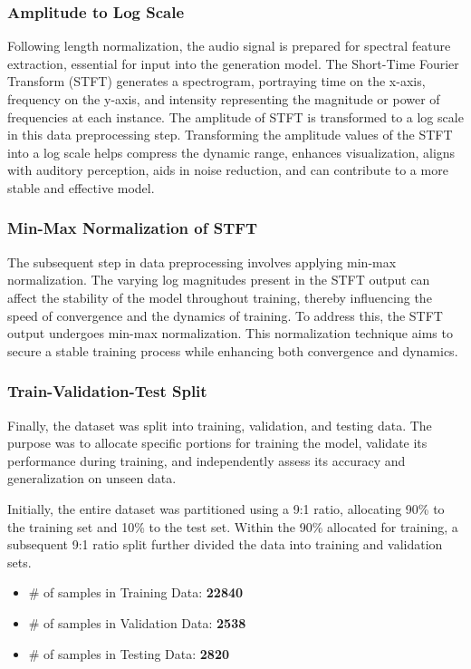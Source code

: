 \documentclass[12pt]{article}
\begin{document}
\subsubsection{Amplitude to Log Scale}
Following length normalization, the audio signal is prepared for spectral feature extraction, essential for input into the generation model. The Short-Time Fourier Transform (STFT) generates a spectrogram, portraying time on the x-axis, frequency on the y-axis, and intensity representing the magnitude or power of frequencies at each instance. The amplitude of STFT is transformed to a log scale in this data preprocessing step. Transforming the amplitude values of the STFT into a log scale helps compress the dynamic range, enhances visualization, aligns with auditory perception, aids in noise reduction, and can contribute to a more stable and effective model.

\subsubsection{Min-Max Normalization of STFT}
The subsequent step in data preprocessing involves applying min-max normalization. The varying log magnitudes present in the STFT output can affect the stability of the model throughout training, thereby influencing the speed of convergence and the dynamics of training. To address this, the STFT output undergoes min-max normalization. This normalization technique aims to secure a stable training process while enhancing both convergence and dynamics.

\subsubsection{Train-Validation-Test Split}
Finally, the dataset was split into training, validation, and testing data. The purpose was to allocate specific portions for training the model, validate its performance during training, and independently assess its accuracy and generalization on unseen data.

Initially, the entire dataset was partitioned using a 9:1 ratio, allocating 90\% to the training set and 10\% to the test set. Within the 90\% allocated for training, a subsequent 9:1 ratio split further divided the data into training and validation sets.

\begin{itemize}
    \item \# of samples in Training Data: \textbf{22840}
    \item \# of samples in Validation Data: \textbf{2538}
    \item \# of samples in Testing Data: \textbf{2820}
\end{itemize}
\end{document}
